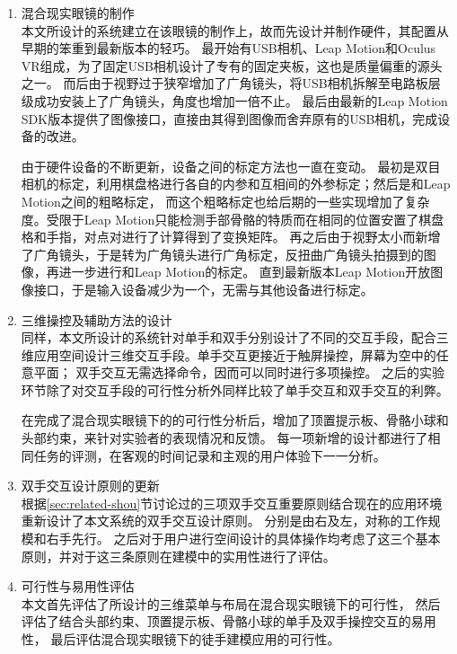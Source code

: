 \begin{enumerate}
\item 混合现实眼镜的制作\hfill\\
本文所设计的系统建立在该眼镜的制作上，故而先设计并制作硬件，其配置从早期的笨重到最新版本的轻巧。
最开始有USB相机、Leap Motion和Oculus VR组成，为了固定USB相机设计了专有的固定夹板，这也是质量偏重的源头之一。
而后由于视野过于狭窄增加了广角镜头，将USB相机拆解至电路板层级成功安装上了广角镜头，角度也增加一倍不止。
最后由最新的Leap Motion SDK版本提供了图像接口，直接由其得到图像而舍弃原有的USB相机，完成设备的改进。

由于硬件设备的不断更新，设备之间的标定方法也一直在变动。
最初是双目相机的标定，利用棋盘格进行各自的内参和互相间的外参标定；然后是和Leap Motion之间的粗略标定，
而这个粗略标定也给后期的一些实现增加了复杂度。受限于Leap Motion只能检测手部骨骼的特质而在相同的位置安置了棋盘格和手指，对点对进行了计算得到了变换矩阵。
再之后由于视野太小而新增了广角镜头，于是转为广角镜头进行广角标定，反扭曲广角镜头拍摄到的图像，再进一步进行和Leap Motion的标定。
直到最新版本Leap Motion开放图像接口，于是输入设备减少为一个，无需与其他设备进行标定。

\item 三维操控及辅助方法的设计\hfill\\
同样，本文所设计的系统针对单手和双手分别设计了不同的交互手段，配合三维应用空间设计三维交互手段。单手交互更接近于触屏操控，屏幕为空中的任意平面；
双手交互无需选择命令，因而可以同时进行多项操控。
之后的实验环节除了对交互手段的可行性分析外同样比较了单手交互和双手交互的利弊。

在完成了混合现实眼镜下的的可行性分析后，增加了顶置提示板、骨骼小球和头部约束，来针对实验者的表现情况和反馈。
每一项新增的设计都进行了相同任务的评测，在客观的时间记录和主观的用户体验下一一分析。

\item 双手交互设计原则的更新 \hfill\\
根据\ref{sec:related-shou}节讨论过的三项双手交互重要原则结合现在的应用环境重新设计了本文系统的双手交互设计原则。
分别是由右及左，对称的工作规模和右手先行。
之后对于用户进行空间设计的具体操作均考虑了这三个基本原则，并对于这三条原则在建模中的实用性进行了评估。

\item 可行性与易用性评估 \hfill\\
本文首先评估了所设计的三维菜单与布局在混合现实眼镜下的可行性，
然后评估了结合头部约束、顶置提示板、骨骼小球的单手及双手操控交互的易用性，
最后评估混合现实眼镜下的徒手建模应用的可行性。

\end{enumerate}

